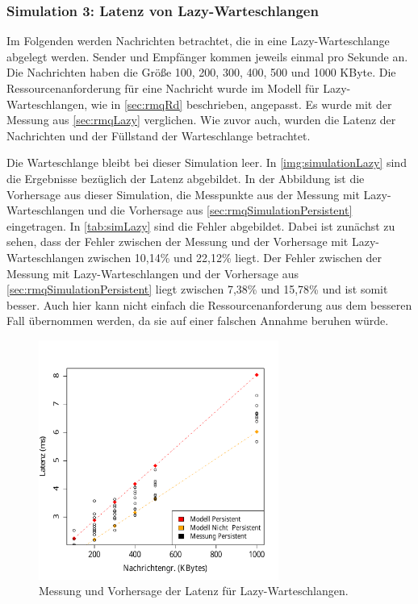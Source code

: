 \subsubsection{Simulation 3: Latenz von Lazy-Warteschlangen}
Im Folgenden werden Nachrichten betrachtet, die in eine Lazy-Warteschlange abgelegt werden. Sender und Empfänger kommen jeweils einmal pro Sekunde an. Die Nachrichten haben die Größe 100, 200, 300, 400, 500 und 1000 KByte. Die Ressourcenanforderung für eine Nachricht wurde im Modell für Lazy-Warteschlangen, wie in \autoref{sec:rmqRd} beschrieben, angepasst. Es wurde mit der Messung aus \autoref{sec:rmqLazy} verglichen. Wie zuvor auch, wurden die Latenz der Nachrichten und der Füllstand der Warteschlange betrachtet. \par
Die Warteschlange bleibt bei dieser Simulation leer. In \autoref{img:simulationLazy} sind die Ergebnisse bezüglich der Latenz abgebildet. In der Abbildung ist die Vorhersage aus dieser Simulation, die Messpunkte aus der Messung mit Lazy-Warteschlangen und die Vorhersage aus \autoref{sec:rmqSimulationPersistent} eingetragen. In \autoref{tab:simLazy} sind die Fehler abgebildet. Dabei ist zunächst zu sehen, dass der Fehler zwischen der Messung und der Vorhersage mit Lazy-Warteschlangen zwischen 10,14\% und 22,12\% liegt. Der Fehler zwischen der Messung mit Lazy-Warteschlangen und der Vorhersage aus \autoref{sec:rmqSimulationPersistent} liegt zwischen 7,38\% und 15,78\% und ist somit besser. Auch hier kann nicht einfach die Ressourcenanforderung aus dem besseren Fall übernommen werden, da sie auf einer falschen Annahme beruhen würde.
\begin{figure}
\center
  \includegraphics[width=0.7\textwidth]{images/modelSimulationResults/simulation6.pdf}
  \caption{Messung und Vorhersage der Latenz für Lazy-Warteschlangen.}
  \label{img:simulationLazy}
\end{figure}

